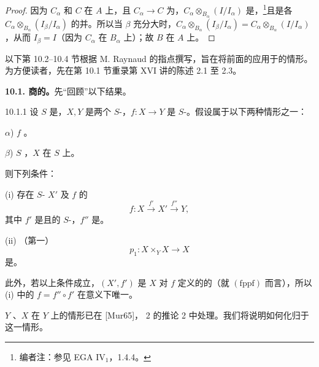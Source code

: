 \begin{proof}
因为 $C_\alpha$ 和 $C$ 在 $A$ 上，且 $C_\alpha\to C$ 为，$C_\alpha\otimes_{B_\alpha}(I/I_\alpha)$ 是，\footnote{编者注：参见 EGA IV$_1$，1.4.4。}且是各 $C_\alpha\otimes_{B_\alpha}(I_\beta/I_\alpha)$ 的并。所以当 $\beta$ 充分大时，$C_\alpha\otimes_{B_\alpha}(I_\beta/I_\alpha)=C_\alpha\otimes_{B_\alpha}(I/I_\alpha)$，从而 $I_\beta=I$（因为 $C_\alpha$ 在 $B_\alpha$ 上）；故 $B$ 在 $A$ 上。
\end{proof}

以下第 10.2--10.4 节根据 M. Raynaud 的指点撰写，旨在将前面的应用于的情形。为方便读者，先在第 10.1 节重录第 XVI 讲的陈述 2.1 至 2.3。

\textbf{10.1. 商的。}先“回顾”以下结果。
\begin{SGAresult}{}{10.1.1}
设 $S$ 是，$X,Y$ 是两个 $S$-，$f:X\to Y$ 是 $S$-。假设属于以下两种情形之一：

$\alpha$)  $f$ 。

$\beta$)  $S$ ，$X$ 在 $S$ 上。

则下列条件：

(i) 存在 $S$- $X'$ 及 $f$ 的
\[
f:X\xrightarrow{f'}X'\xrightarrow{f''}Y,
\]
其中 $f'$ 是且的 $S$-，$f''$ 是。

(ii) （第一）
\[
p_1:X\times_YX\longrightarrow X
\]
是。

此外，若以上条件成立，$(X',f')$ 是 $X$ 对 $f$ 定义的的（就 $(\mathrm{fppf})$ 而言），所以 (i) 中的 $f=f''\circ f'$ 在意义下唯一。
\end{SGAresult}
$Y$ 、$X$ 在 $Y$ 上的情形已在 [Mur65]， 2 的推论 2 中处理。我们将说明如何化归于这一情形。

